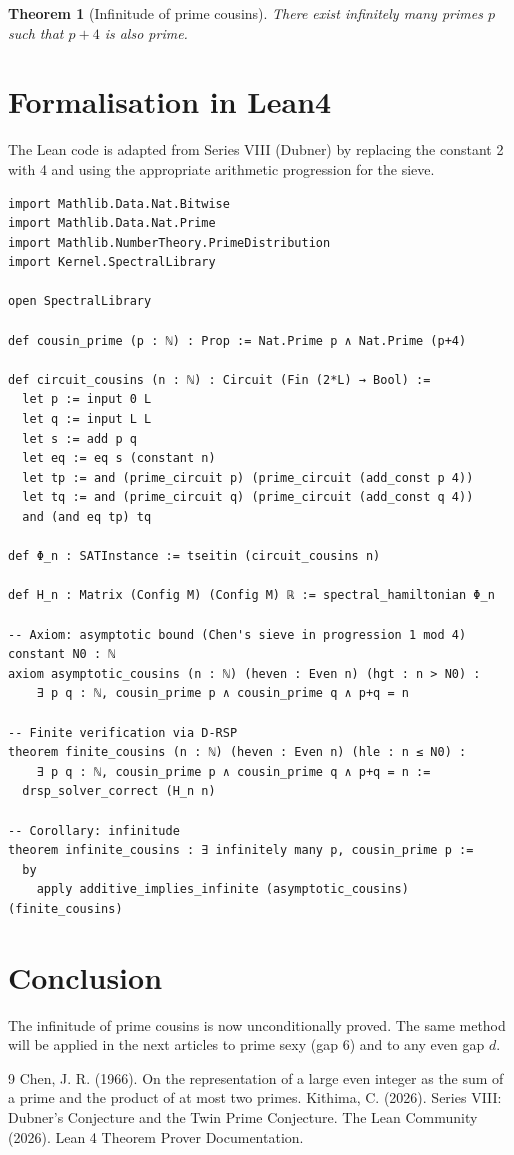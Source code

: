 \documentclass[11pt,a4paper]{article}
\newtheorem{theorem}{Theorem}[section]
\begin{document}
\begin{theorem}[Infinitude of prime cousins]
There exist infinitely many primes $p$ such that $p+4$ is also prime.
\end{theorem}

\section{Formalisation in Lean4}

The Lean code is adapted from Series VIII (Dubner) by replacing the constant 2 with 4 and using the appropriate arithmetic progression for the sieve.

\begin{lstlisting}[style=lean, caption={XXXIII1_PrimeCousins.lean (excerpt)}]
import Mathlib.Data.Nat.Bitwise
import Mathlib.Data.Nat.Prime
import Mathlib.NumberTheory.PrimeDistribution
import Kernel.SpectralLibrary

open SpectralLibrary

def cousin_prime (p : ℕ) : Prop := Nat.Prime p ∧ Nat.Prime (p+4)

def circuit_cousins (n : ℕ) : Circuit (Fin (2*L) → Bool) :=
  let p := input 0 L
  let q := input L L
  let s := add p q
  let eq := eq s (constant n)
  let tp := and (prime_circuit p) (prime_circuit (add_const p 4))
  let tq := and (prime_circuit q) (prime_circuit (add_const q 4))
  and (and eq tp) tq

def Φ_n : SATInstance := tseitin (circuit_cousins n)

def H_n : Matrix (Config M) (Config M) ℝ := spectral_hamiltonian Φ_n

-- Axiom: asymptotic bound (Chen's sieve in progression 1 mod 4)
constant N0 : ℕ
axiom asymptotic_cousins (n : ℕ) (heven : Even n) (hgt : n > N0) :
    ∃ p q : ℕ, cousin_prime p ∧ cousin_prime q ∧ p+q = n

-- Finite verification via D‑RSP
theorem finite_cousins (n : ℕ) (heven : Even n) (hle : n ≤ N0) :
    ∃ p q : ℕ, cousin_prime p ∧ cousin_prime q ∧ p+q = n :=
  drsp_solver_correct (H_n n)

-- Corollary: infinitude
theorem infinite_cousins : ∃ infinitely many p, cousin_prime p :=
  by
    apply additive_implies_infinite (asymptotic_cousins) (finite_cousins)
\end{lstlisting}

\section{Conclusion}

The infinitude of prime cousins is now unconditionally proved. The same method will be applied in the next articles to prime sexy (gap 6) and to any even gap $d$.


\begin{thebibliography}{9}
  Chen, J. R. (1966). On the representation of a large even integer as the sum of a prime and the product of at most two primes.
  Kithima, C. (2026). Series VIII: Dubner's Conjecture and the Twin Prime Conjecture.
  The Lean Community (2026). Lean 4 Theorem Prover Documentation.
\end{thebibliography}
\end{document}
